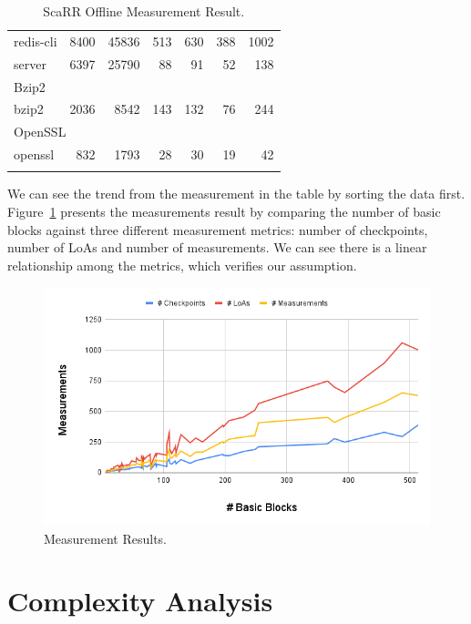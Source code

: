 {\begin{longtable}{lrrrrrr}
    redis-cli       & 8400       & 45836    & 513             & 630             & 388            & 1002       \\
    server          & 6397       & 25790    & 88              & 91              & 52             & 138       \\
    \midrule 
    \multicolumn{7}{l}{Bzip2} \\
    \midrule 
    bzip2           & 2036       & 8542    & 143             & 132             & 76            & 244       \\
    \midrule 
    \multicolumn{7}{l}{OpenSSL} \\
    \midrule 
    openssl         & 832        & 1793    & 28              & 30              & 19            & 42       \\
    \bottomrule
    \caption{ScaRR Offline Measurement Result.}
    \label{table:scarr-result}
    \end{longtable}
}

We can see the trend from the measurement in the table by sorting the data
first. Figure~\ref{fig:measurement-result} presents the measurements result by
comparing the number of basic blocks against three different measurement
metrics: number of checkpoints, number of LoAs and number of measurements. We
can see there is a linear relationship among the metrics, which verifies
our assumption.


\begin{figure}[t]
    \centerline{\includegraphics[scale=.65]{Figures/05/scarr-result-v2.png}}
    \caption{Measurement Results.} 
    \label{fig:measurement-result}
\end{figure}


\section{Complexity Analysis}

